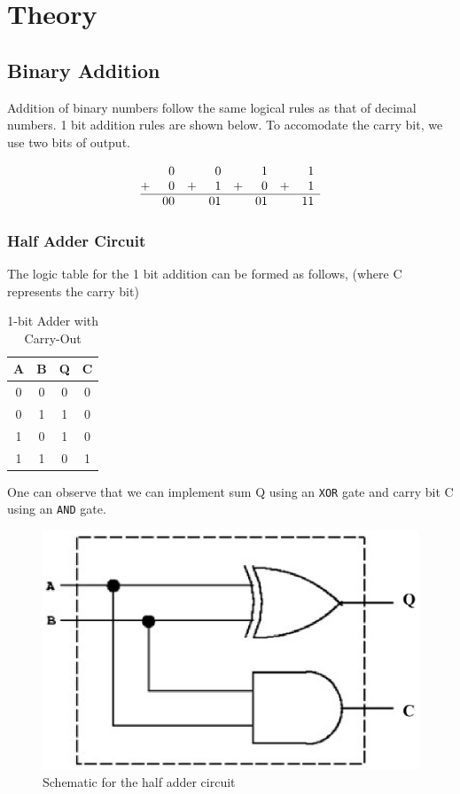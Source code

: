 \section{Theory}

\subsection*{Binary Addition}
Addition of binary numbers follow the same logical rules as that of decimal numbers. 1 bit addition rules are shown below. To accomodate the carry bit, we use two bits of output.

\[
\begin{array}{@{}cr@{\,\,\,\,\,\,}rr@{\,\,\,\,\,\,}rr@{\,\,\,\,\,\,}rr}
    & 0 & & 0 & & 1 & & 1\\
+  & 0 & + & 1& + & 0& + & 1\\ \hline
  & 00 & & 01 && 01 && 11
\end{array}
\]

\subsubsection*{Half Adder Circuit}

The logic table for the 1 bit addition can be formed as follows, (where C represents the carry bit)

\begin{table}[H]
    \centering
    \begin{tabular}{|c|c|c|c|}\hline
    A & B & Q & C \\ \hline
    0 & 0 & 0 & 0 \\ 
    0 & 1 & 1 & 0 \\ 
    1 & 0 & 1 & 0 \\ 
    1 & 1 & 0 & 1 \\ \hline
    \end{tabular}
    \caption{1-bit Adder with Carry-Out}
\end{table}

One can observe that we can implement sum Q using an \verb|XOR| gate and carry bit C using an \verb|AND| gate.

\begin{figure}[H]
    \centering
    \includegraphics[width=0.5\columnwidth]{images/half-adder.png}
    \caption{Schematic for the half adder circuit}
    \label{half-adder}
\end{figure}

